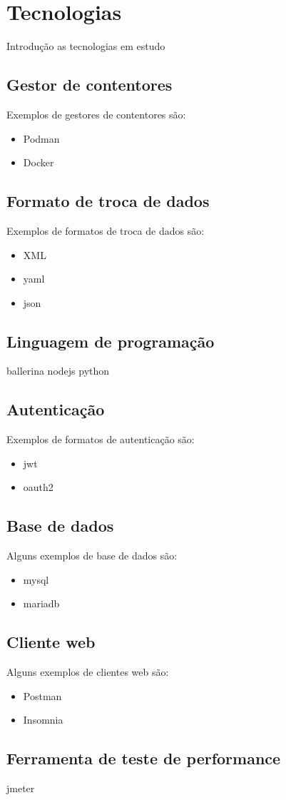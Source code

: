 \section{Tecnologias}

Introdução as tecnologias em estudo

\subsection{Gestor de contentores}
Exemplos de gestores de contentores são:
\begin{itemize}
    \item Podman
    \item Docker
\end{itemize}

\subsection{Formato de troca de dados}

Exemplos de formatos de troca de dados são:
\begin{itemize}
    \item XML
    \item \ac{yaml}
    \item \ac{json}
\end{itemize}

\subsection{Linguagem de programação}

ballerina
nodejs
python

\subsection{Autenticação}

Exemplos de formatos de autenticação são:
\begin{itemize}
    \item \ac{jwt}
    \item \ac{oauth2}
\end{itemize}

\subsection{Base de dados}

Alguns exemplos de base de dados são:
\begin{itemize}
    \item \ac{mysql}
    \item \ac{mariadb}
\end{itemize}

\subsection{Cliente web}
Alguns exemplos de clientes web são:
\begin{itemize}
    \item Postman
    \item Insomnia
\end{itemize}

\subsection{Ferramenta de teste de performance}
jmeter
